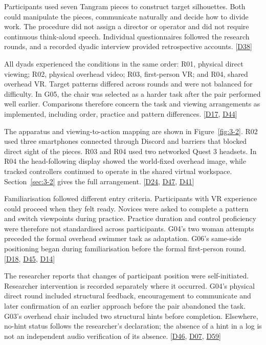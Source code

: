 Participants used seven Tangram pieces to construct target silhouettes. Both could manipulate the pieces, communicate naturally and decide how to divide work. The procedure did not assign a director or operator and did not require continuous think-aloud speech. Individual questionnaires followed the research rounds, and a recorded dyadic interview provided retrospective accounts. [\hyperlink{src:D38}{D38}]

All dyads experienced the conditions in the same order: R01, physical direct viewing; R02, physical overhead video; R03, first-person VR; and R04, shared overhead VR. Target patterns differed across rounds and were not balanced for difficulty. In G05, the chair was selected as a harder task after the pair performed well earlier. Comparisons therefore concern the task and viewing arrangements as implemented, including order, practice and pattern differences. [\hyperlink{src:D17}{D17}, \hyperlink{src:D44}{D44}]

The apparatus and viewing-to-action mapping are shown in Figure~\ref{fig:3-2}. R02 used three smartphones connected through Discord and barriers that blocked direct sight of the pieces. R03 and R04 used two networked Quest 3 headsets. In R04 the head-following display showed the world-fixed overhead image, while tracked controllers continued to operate in the shared virtual workspace. Section~\ref{sec:3-2} gives the full arrangement. [\hyperlink{src:D24}{D24}, \hyperlink{src:D47}{D47}, \hyperlink{src:D41}{D41}]

Familiarisation followed different entry criteria. Participants with VR experience could proceed when they felt ready. Novices were asked to complete a pattern and switch viewpoints during practice. Practice duration and control proficiency were therefore not standardised across participants. G04's two woman attempts preceded the formal overhead swimmer task as adaptation. G06's same-side positioning began during familiarisation before the formal first-person round. [\hyperlink{src:D18}{D18}, \hyperlink{src:D45}{D45}, \hyperlink{src:D14}{D14}]

The researcher reports that changes of participant position were self-initiated. Researcher intervention is recorded separately where it occurred. G04's physical direct round included structural feedback, encouragement to communicate and later confirmation of an earlier approach before the pair abandoned the task. G03's overhead chair included two structural hints before completion. Elsewhere, no-hint status follows the researcher's declaration; the absence of a hint in a log is not an independent audio verification of its absence. [\hyperlink{src:D46}{D46}, \hyperlink{src:D07}{D07}, \hyperlink{src:D59}{D59}]


